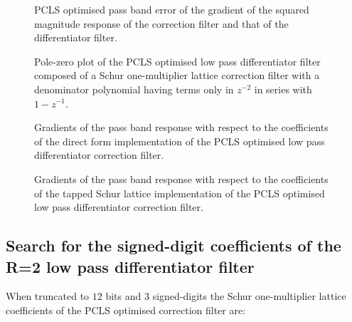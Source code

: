 \documentclass[a4paper,twoside,10pt,english]{article}
\newcommand{\DesignOfSchurLatticeFiltersPdfScale}{1}
\begin{document}
\begin{figure}
\centering
\scalebox{\DesignOfSchurLatticeFiltersPdfScale}{}
\caption{PCLS optimised pass band error of the gradient of the squared magnitude
  response of the correction filter and that of the differentiator filter.}
\label{fig:Schur-OneM-lattice-lowpass-differentiator-R2-dCsqdw-dAsqdw-error}
\end{figure}

\begin{figure}
\centering
\scalebox{\DesignOfSchurLatticeFiltersPdfScale}{}
\caption{Pole-zero plot of the PCLS optimised low pass differentiator
  filter composed of a Schur one-multiplier lattice correction filter with a
  denominator polynomial having terms only in $z^{-2}$ in series with $1-z^{-1}$.}
\label{fig:Schur-OneM-lattice-lowpass-differentiator-R2-pz}
\end{figure}

\begin{figure}
\centering
\scalebox{\DesignOfSchurLatticeFiltersPdfScale}{}
\caption{Gradients of the pass band response with respect to the coefficients of
  the direct form implementation of the PCLS optimised low pass differentiator
  correction filter.}
\label{fig:Schur-OneM-lattice-correction-lowpass-differentiator-direct-sens}
\end{figure}

\begin{figure}
\centering
\scalebox{\DesignOfSchurLatticeFiltersPdfScale}{}
\caption{Gradients of the pass band response with respect to the coefficients of
  the tapped Schur lattice implementation of the PCLS optimised low pass
  differentiator correction filter.}
\label{fig:Schur-OneM-lattice-correction-lowpass-differentiator-Schur-sens}
\end{figure}

\clearpage

\subsection{Search for the signed-digit coefficients of the R=2 low pass differentiator filter}

When truncated to $12$ bits and $3$ signed-digits the Schur one-multiplier
lattice coefficients of the PCLS optimised correction filter are:
\begin{small}


\end{small}
\end{document}
